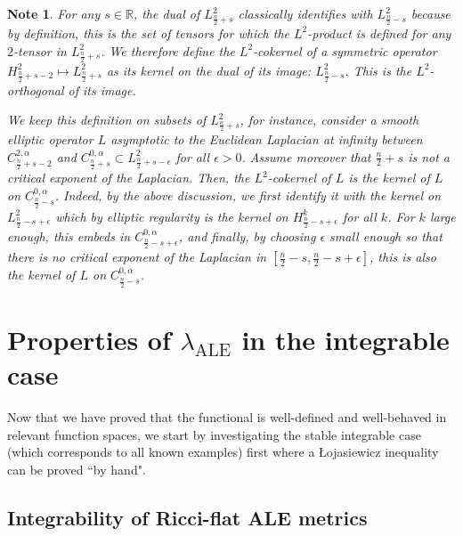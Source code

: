 \documentclass[a4paper,11pt,reqno]{amsart}
\newtheorem{note}[defn]{Note}
\numberwithin{equation}{section}
\begin{document}
	\begin{note}\label{note L2 cokernel}
		For any $s\in \mathbb{R}$, the dual of $ L^2_{\frac{n}{2}+s} $ classically identifies with $ L^2_{\frac{n}{2}-s} $ because by definition, this is the set of tensors for which the $L^2$-product is defined for any $2$-tensor in $ L^2_{\frac{n}{2}+s} $. We therefore define the $L^2$-cokernel of a symmetric operator $H^2_{\frac{n}{2}+s-2}\mapsto L^2_{\frac{n}{2}+s}$ as its kernel on the dual of its image: $L^2_{\frac{n}{2}-s}$. This is the $L^2$-orthogonal of its image. 
		
		We keep this definition on subsets of $ L^2_{\frac{n}{2}+s}$, for instance, consider a smooth elliptic operator $L$ asymptotic to the Euclidean Laplacian at infinity between $ C^{2,\alpha}_{\frac{n}{2}+s-2} $ and $ C^{0,\alpha}_{\frac{n}{2}+s} \subset L^2_{\frac{n}{2}+s-\epsilon}$ for all $\epsilon>0$. Assume moreover that ${\frac{n}{2}+s}$ is not a critical exponent of the Laplacian. Then, the $L^2$-cokernel of $L$ is the kernel of $L$ on $C^{0,\alpha}_{\frac{n}{2}-s}$. Indeed, by the above discussion, we first identify it with the kernel on $L^2_{\frac{n}{2}-s+\epsilon}$ which by elliptic regularity is the kernel on $H^k_{\frac{n}{2}-s+\epsilon}$ for all $k$. For $k$ large enough, this embeds in $C^{0,\alpha}_{\frac{n}{2}-s+\epsilon}$, and finally, by choosing $\epsilon$ small enough so that there is no critical exponent of the Laplacian in $[\frac{n}{2}-s,\frac{n}{2}-s+\epsilon] $, this is also the kernel of $L$ on $C^{0,\alpha}_{\frac{n}{2}-s}$.
	\end{note}
	
	
	\section{Properties of $\lambda_{\operatorname{ALE}}$ in the integrable case}\label{loj-sim-sec-int-case}
	Now that we have proved that the functional is well-defined and well-behaved in relevant function spaces, we start by investigating the stable integrable case (which corresponds to all known examples) first where a \L{}ojasiewicz inequality can be proved ``by hand".
	
	\subsection{Integrability of Ricci-flat ALE metrics}\label{sec-int-ric-fla}
\end{document}

